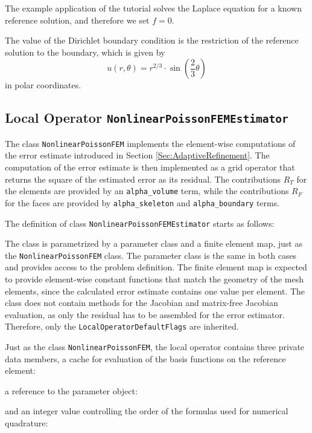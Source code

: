 \documentclass[a4paper,12pt]{article}
\begin{document}

The example application of the tutorial solves the Laplace equation for a known reference
solution, and therefore we set $f = 0$.


The value of the Dirichlet boundary condition is the restriction of the reference solution
to the boundary, which is given by
\begin{equation*}
  u (r, \theta) = r^{2/3} \cdot \sin\left(\frac{2}{3} \theta\right)
\end{equation*}
in polar coordinates.

\subsection{Local Operator \lstinline{NonlinearPoissonFEMEstimator}}

The class \lstinline{NonlinearPoissonFEM} implements the
element-wise computations of the error estimate introduced in
Section \ref{Sec:AdaptiveRefinement}. The computation of the error
estimate is then implemented as a grid operator that returns the square of the
estimated error as its residual. The contributions $R_T$ for the elements
are provided by an \lstinline{alpha_volume} term, while the contributions
$R_F$ for the faces are provided by \lstinline{alpha_skeleton} and
\lstinline{alpha_boundary} terms.

The definition of class \lstinline{NonlinearPoissonFEMEstimator} starts as follows:

The class is parametrized by a parameter class and a finite element map, just as
the \lstinline{NonlinearPoissonFEM} class. The parameter class is the same in
both cases and provides access to the problem definition. The finite element map
is expected to provide element-wise constant functions that match the geometry
of the mesh elements, since the calculated error estimate contains one value per
element. The class does not contain methods for the Jacobian and matrix-free
Jacobian evaluation, as only the residual has to be assembled for the error
estimator. Therefore, only the \lstinline{LocalOperatorDefaultFlags} are inherited.

Just as the class \lstinline{NonlinearPoissonFEM}, the local operator contains
three private data members, a cache for evaluation of the basis functions on the
reference element:

a reference to the parameter object:

and an integer value controlling the order of the formulas used for numerical quadrature:

\end{document}
